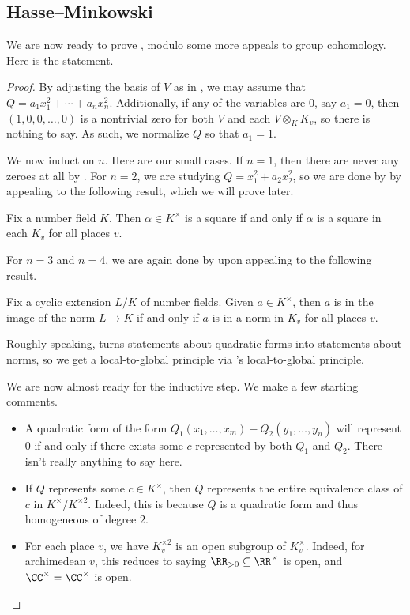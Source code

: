 \documentclass[../notes.tex]{subfiles}
\begin{document}
\subsection{Hasse--Minkowski}
We are now ready to prove , modulo some more appeals to group cohomology. Here is the statement.
\hmthm*
\begin{proof}
	By adjusting the basis of $V$ as in , we may assume that $Q=a_1x_1^2+\cdots+a_nx_n^2$. Additionally, if any of the variables are $0$, say $a_1=0$, then $(1,0,0,\ldots,0)$ is a nontrivial zero for both $V$ and each $V\otimes_KK_v$, so there is nothing to say. As such, we normalize $Q$ so that $a_1=1$.

	We now induct on $n$. Here are our small cases. If $n=1$, then there are never any zeroes at all by . For $n=2$, we are studying $Q=x_1^2+a_2x_2^2$, so we are done by  by appealing to the following result, which we will prove later.
	\begin{theorem}
		Fix a number field $K$. Then $\alpha\in K^\times$ is a square if and only if $\alpha$ is a square in each $K_v$ for all places $v$.
	\end{theorem}
	For $n=3$ and $n=4$, we are again done by  upon appealing to the following result.
	\begin{theorem} \label{thm:hasse-norm}
		Fix a cyclic extension $L/K$ of number fields. Given $a\in K^\times$, then $a$ is in the image of the norm $L\to K$ if and only if $a$ is in a norm in $K_v$ for all places $v$.
	\end{theorem}
	Roughly speaking,  turns statements about quadratic forms into statements about norms, so we get a local-to-global principle via 's local-to-global principle.

	We are now almost ready for the inductive step. We make a few starting comments.
	\begin{itemize}
		\item A quadratic form of the form $Q_1(x_1,\ldots,x_m)-Q_2(y_1,\ldots,y_n)$ will represent $0$ if and only if there exists some $c$ represented by both $Q_1$ and $Q_2$. There isn't really anything to say here.
		\item If $Q$ represents some $c\in K^\times$, then $Q$ represents the entire equivalence class of $c$ in $K^\times/K^{\times2}$. Indeed, this is because $Q$ is a quadratic form and thus homogeneous of degree $2$.
		\item For each place $v$, we have $K_v^{\times2}$ is an open subgroup of $K_v^\times$. Indeed, for archimedean $v$, this reduces to saying $\RR_{>0}\subseteq\RR^\times$ is open, and $\CC^\times=\CC^\times$ is open.


\end{itemize}
\end{proof}
\end{document}
